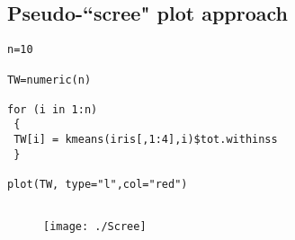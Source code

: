 \documentclass[12pt]{article}
\begin{document}
\subsection{Pseudo-``scree" plot approach}
\begin{framed}
\begin{verbatim}
n=10

TW=numeric(n)

for (i in 1:n)
 {
 TW[i] = kmeans(iris[,1:4],i)$tot.withinss
 }

plot(TW, type="l",col="red")


\end{verbatim}
\end{framed}
\begin{figure}[h!]
\centering
\texttt{[image: ./Scree]}

\end{figure}
\end{document}
